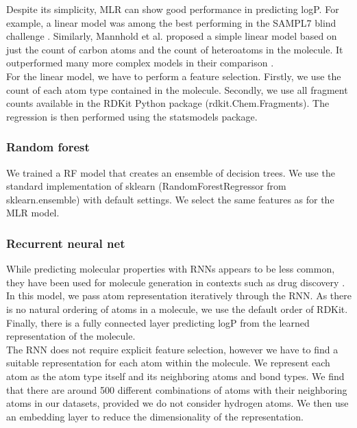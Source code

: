 \documentclass{article}
\theoremstyle{definition}
\theoremstyle{remark}
\begin{document}
Despite its simplicity, MLR can show good performance in predicting logP. For example, a linear model was among the best performing in the SAMPL7 blind challenge \cite{lopez2021multiple}. Similarly, Mannhold et al. proposed a simple linear model based on just the count of carbon atoms and the count of heteroatoms in the molecule. It outperformed many more complex models in their comparison \cite{mannhold2009calculation}.\\

For the linear model, we have to perform a feature selection. Firstly, we use the count of each atom type contained in the molecule. Secondly, we use all fragment counts available in the RDKit Python package (rdkit.Chem.Fragments). The regression is then performed using the statsmodels package.

\subsubsection{Random forest}

We trained a RF model that creates an ensemble of decision trees. We use the standard implementation of sklearn (RandomForestRegressor from sklearn.ensemble) with default settings. We select the same features as for the MLR model.

\subsubsection{Recurrent neural net}

While predicting molecular properties with RNNs appears to be less common, they have been used for molecule generation in contexts such as drug discovery \cite{bjerrum2017molecular}. In this model, we pass atom representation iteratively through the RNN. As there is no natural ordering of atoms in a molecule, we use the default order of RDKit. Finally, there is a fully connected layer predicting logP from the learned representation of the molecule.\\

The RNN does not require explicit feature selection, however we have to find a suitable representation for each atom within the molecule. We represent each atom as the atom type itself and its neighboring atoms and bond types. We find that there are around 500 different combinations of atoms with their neighboring atoms in our datasets, provided we do not consider hydrogen atoms. We then use an embedding layer to reduce the dimensionality of the representation.\\
\end{document}
